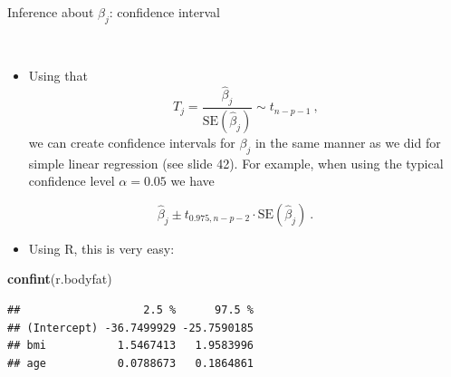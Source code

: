\documentclass[10pt,ignorenonframetext,]{beamer}
\newenvironment{Shaded}{\begin{snugshade}}{\end{snugshade}}
\newcommand{\KeywordTok}[1]{\textcolor[rgb]{0.13,0.29,0.53}{\textbf{#1}}}
\newcommand{\NormalTok}[1]{#1}
\providecommand{\tightlist}{%
  \setlength{\itemsep}{0pt}\setlength{\parskip}{0pt}}
\begin{document}
\begin{frame}[fragile]

\begin{block}{Inference about \(\beta_j\): confidence interval}

\(~\)

\begin{itemize}
\tightlist
\item
  Using that
  \[ T_j=\frac{\hat{\beta}_j}{\text{SE}(\hat\beta_j)}\sim t_{n-p-1} \ ,\]
  we can create confidence intervals for \(\beta_j\) in the same manner
  as we did for simple linear regression (see slide 42). For example,
  when using the typical confidence level \(\alpha=0.05\) we have
\end{itemize}

\[\hat{\beta}_j \pm t_{0.975,n-p-2} \cdot\text{SE} (\hat{\beta}_j)  \ .\]

\begin{itemize}
\tightlist
\item
  Using R, this is very easy:
\end{itemize}

\footnotesize

\begin{Shaded}
\begin{Highlighting}[]
\KeywordTok{confint}\NormalTok{(r.bodyfat)}
\end{Highlighting}
\end{Shaded}

\begin{verbatim}
##                   2.5 %      97.5 %
## (Intercept) -36.7499929 -25.7590185
## bmi           1.5467413   1.9583996
## age           0.0788673   0.1864861
\end{verbatim}

\end{block}

\end{frame}
\end{document}
